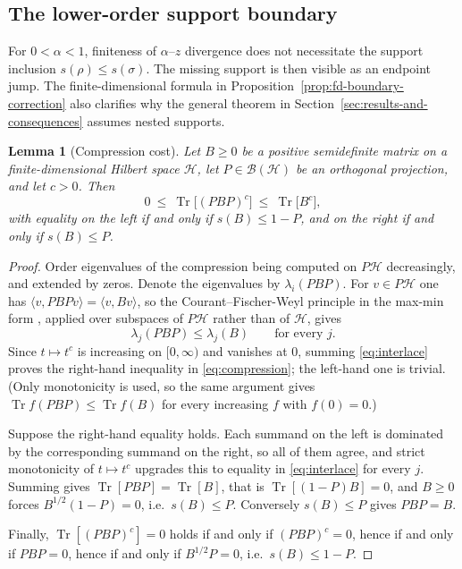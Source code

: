 \documentclass[12pt]{article}
\numberwithin{equation}{section}
\newtheorem{lemma}[theorem]{Lemma}
\theoremstyle{definition}
\theoremstyle{remark}
\newcommand{\az}{$\alpha$--$z$}
\newcommand{\?}{\overset{?}{=}}
\renewcommand{\a}{\alpha}	%
\renewcommand{\r}{\rho}		%
\newcommand{\s}{\sigma}
\begin{document}
\subsection{The lower-order support boundary}
\label{subsec:fd-support-boundary}

For $0<\a<1$, finiteness of {\az} divergence does not necessitate the support inclusion $s(\r)\leq s(\s)$.  The missing
support is then visible as an endpoint jump.  The finite-dimensional
formula in Proposition~\ref{prop:fd-boundary-correction} also clarifies why the general theorem in
Section~\ref{sec:results-and-consequences} assumes nested supports.

\begin{lemma}[Compression cost]\label{lem:compression}
Let $B\ge0$ be a positive semidefinite matrix on a finite-dimensional Hilbert space
$\mathcal H$, let $P\in\mathcal B(\mathcal H)$ be an orthogonal projection, and let $c>0$.
Then
\begin{equation}\label{eq:compression}
  0\ \le\ \operatorname{Tr}\big[(PBP)^{c}\big]\ \le\ \operatorname{Tr}\big[B^{c}\big],
\end{equation}
with equality on the left if and only if $s(B)\le 1-P$, and on the right if and only if
$s(B)\le P$.
\end{lemma}

\begin{proof}
Order eigenvalues of the compression being computed on $P\mathcal H$ decreasingly,
and extended by zeros. Denote the eigenvalues by $\lambda_i(PBP)$. For $v\in P\mathcal H$ one has $\langle v,PBPv\rangle=\langle v,Bv\rangle$,
so the Courant--Fischer-Weyl principle in the max-min form \cite[Corollary III.1.2]{Bhatia:1997}, applied over subspaces of $P\mathcal H$ rather than of $\mathcal H$, gives
\begin{equation}\label{eq:interlace}
  \lambda_{j}(PBP)\le\lambda_{j}(B)\qquad\text{for every }j.
\end{equation}
Since $t\mapsto t^{c}$ is increasing on $[0,\infty)$ and vanishes at $0$, summing
\eqref{eq:interlace} proves the right-hand inequality in \eqref{eq:compression}; the
left-hand one is trivial. (Only monotonicity is used, so the same argument gives
$\operatorname{Tr}f(PBP)\le\operatorname{Tr}f(B)$ for every increasing $f$ with $f(0)=0$.)

Suppose the right-hand equality holds. Each summand on the left is dominated by the
corresponding summand on the right, so all of them agree, and strict monotonicity of
$t\mapsto t^{c}$ upgrades this to equality in \eqref{eq:interlace} for every $j$. Summing
gives $\operatorname{Tr}[PBP]=\operatorname{Tr}[B]$, that is $\operatorname{Tr}[(1-P)B]=0$,
and $B\ge0$ forces $B^{1/2}(1-P)=0$, i.e.\ $s(B)\le P$. Conversely $s(B)\le P$ gives
$PBP=B$.

Finally, $\operatorname{Tr}[(PBP)^{c}]=0$ holds if and only if $(PBP)^{c}=0$, hence if and
only if $PBP=0$, hence if and only if $B^{1/2}P=0$, i.e.\ $s(B)\le 1-P$.
\end{proof}
\end{document}
